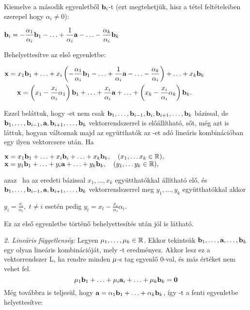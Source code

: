 \documentclass[a4paper,11.5pt]{article}
\begin{document}
	Kiemelve a második egyenletből $\textbf{b}_i$-t (ezt megtehetjük, hisz a tétel feltételeiben szerepel hogy $\alpha_i\not=0$):
		
	\begin{center}
		$\begin{gathered}
			 \textbf{b}_i=-\frac{\alpha_1}{\alpha_i}\textbf{b}_1-\ldots+\frac{1}{\alpha_i} \textbf{a}-\ldots-\frac{\alpha_k}{\alpha_i}\textbf{b}_k
		\end{gathered}$
	\end{center}
	
	Behelyettesítve az első egyenletbe:
	
	\begin{center}
		$\begin{gathered}
			\textbf{x}=x_1\textbf{b}_1+\ldots+x_i\left(-\frac{\alpha_1}{\alpha_i}\textbf{b}_1-\ldots+\frac{1}{\alpha_i} \textbf{a}-\ldots-\frac{\alpha_k}{\alpha_i}\right)+\ldots+ x_k\textbf{b}_k\\
			\textbf{x}=\left(x_1-\frac{x_i}{\alpha_i}\alpha_1\right)\textbf{b}_1+\ldots+\frac{x_i}{\alpha_i} \textbf{a}+\ldots+\left(x_k-\frac{x_i}{\alpha_i}\alpha_k\right)\textbf{b}_k.
		\end{gathered}$
	\end{center}
	
	Ezzel beláttuk, hogy \x-et nem csak $\textbf{b}_1,\ldots,\textbf{b}_{i-1},\textbf{b}_i,\textbf{b}_{i+1},\ldots,\textbf{b}_k$ bázissal, de $\textbf{b}_1,\ldots,\textbf{b}_{i-1},\textbf{a},\textbf{b}_{i+1},\ldots,\textbf{b}_k$ vektorrendszerrel is előállítható, sőt, még azt is láttuk, hogyan változnak majd az együtthatók az \x-et adó lineáris kombinációban egy ilyen vektorcsere után. Ha
	\begin{center}
		$\textbf{x}=x_1\textbf{b}_1+\ldots+x_i\textbf{b}_i+\ldots+ x_k\textbf{b}_k,\quad (x_1,\ldots x_k\in\mathbb{R}),$\\
		$\textbf{x}=y_1\textbf{b}_1+\ldots+y_i\textbf{a}+\ldots+ y_k\textbf{b}_k,\quad (y_1,\ldots y_k\in\mathbb{R}),$
	\end{center}
	azaz \x\ ha az eredeti bázissal $x_1,\ldots,x_k$ együtthatókkal állítható elő, és $\textbf{b}_1,\ldots,\textbf{b}_{i-1},\textbf{a},\textbf{b}_{i+1},\ldots,\textbf{b}_k$ vektorrendszerrel meg $y_1,\ldots,y_k$ együtthatókkal akkor
	\begin{center}
		$\displaystyle y_i=\frac{x_i}{\alpha_i},$ \quad $t\not=i$ esetén pedig \quad $\displaystyle y_t=x_t-\frac{x_i}{\alpha_1}\alpha_i.$
	\end{center}
	Ez az első egyenletbe történő behelyettesítés után jól is látható.
	
	\smallskip
	\emph{2. Lineáris függetlenség:} Legyen $\mu_1,\ldots,\mu_k \in \mathbb{R}$. Ekkor tekintsük $\textbf{b}_1,\ldots,\textbf{a},\ldots,\textbf{b}_k$ egy olyan lineáris kombinációját, mely \0-t eredményez. Akkor lesz ez a vektorrendszer L, ha rendre minden $\mu$-s tag egyenlő 0-val, és más értéket nem vehet fel.
	\[\mu_1\textbf{b}_1+\ldots+\mu_i\textbf{a}_i+\ldots+\mu_k\textbf{b}_k=\textbf{0}\]
	Még továbbra is teljesül, hogy $\textbf{a} = \alpha_1\textbf{b}_1+\ldots+\alpha_k\textbf{b}_k$, így \a-t a fenti egyenletbe helyettesítve:
	
\end{document}
